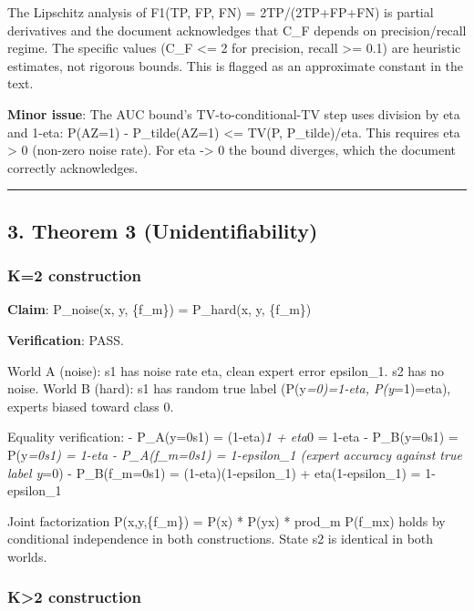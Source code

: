 \documentclass[
  12pt,
]{article}
\begin{document}
The Lipschitz analysis of F1(TP, FP, FN) = 2TP/(2TP+FP+FN) is partial
derivatives and the document acknowledges that C\_F depends on
precision/recall regime. The specific values (C\_F \textless= 2 for
precision, recall \textgreater= 0.1) are heuristic estimates, not
rigorous bounds. This is flagged as an approximate constant in the text.

\textbf{Minor issue}: The AUC bound's TV-to-conditional-TV step uses
division by eta and 1-eta: \textbar P(A\textbar Z=1) -
P\_tilde(A\textbar Z=1)\textbar{} \textless= TV(P, P\_tilde)/eta. This
requires eta \textgreater{} 0 (non-zero noise rate). For eta
-\textgreater{} 0 the bound diverges, which the document correctly
acknowledges.

\begin{center}\rule{0.5\linewidth}{0.5pt}\end{center}

\subsection{3. Theorem 3
(Unidentifiability)}\label{theorem-3-unidentifiability}

\subsubsection{K=2 construction}\label{k2-construction}

\textbf{Claim}: P\_noise(x, y, \{f\_m\}) = P\_hard(x, y, \{f\_m\})

\textbf{Verification}: PASS.

World A (noise): s1 has noise rate eta, clean expert error epsilon\_1.
s2 has no noise. World B (hard): s1 has random true label
(P(y\emph{=0)=1-eta, P(y}=1)=eta), experts biased toward class 0.

Equality verification: - P\_A(y=0\textbar s1) = (1-eta)\emph{1 + eta}0 =
1-eta - P\_B(y=0\textbar s1) = P(y\emph{=0\textbar s1) = 1-eta -
P\_A(f\_m=0\textbar s1) = 1-epsilon\_1 (expert accuracy against true
label y}=0) - P\_B(f\_m=0\textbar s1) = (1-eta)(1-epsilon\_1) +
eta(1-epsilon\_1) = 1-epsilon\_1

Joint factorization P(x,y,\{f\_m\}) = P(x) * P(y\textbar x) * prod\_m
P(f\_m\textbar x) holds by conditional independence in both
constructions. State s2 is identical in both worlds.

\subsubsection{K\textgreater2 construction}\label{k2-construction-1}
\end{document}
